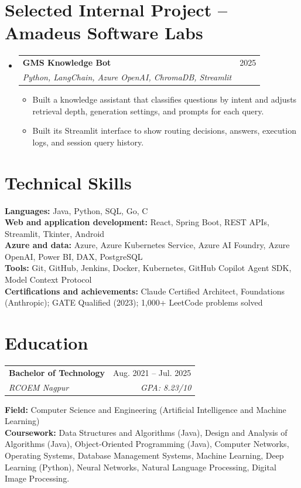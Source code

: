 \documentclass[a4paper,11pt]{article}
\makeatletter
\newcommand{\entry}[4]{\item\begin{tabularx}{\textwidth}{@{}Xr@{}}\textbf{#1}& #2\\\textit{\small #3}&\textit{\small #4}\end{tabularx}\vspace{-5pt}}
\newcommand{\bulletpoint}[1]{\item\small{#1}}
\makeatother
\begin{document}
\section{Selected Internal Project -- Amadeus Software Labs}
\begin{itemize}[leftmargin=0in,label={}]
  \entry{GMS Knowledge Bot}{2025}{Python, LangChain, Azure OpenAI, ChromaDB, Streamlit}{}
  \begin{itemize}
    \bulletpoint{Built a knowledge assistant that classif{}ies questions by intent and adjusts retrieval depth, generation settings, and prompts for each query.}
    \bulletpoint{Built its Streamlit interface to show routing decisions, answers, execution logs, and session query history.}
  \end{itemize}
\end{itemize}

\section{Technical Skills}
\small\textbf{Languages:} Java, Python, SQL, Go, C \\
\textbf{Web and application development:} React, Spring Boot, REST APIs, Streamlit, Tkinter, Android \\
\textbf{Azure and data:} Azure, Azure Kubernetes Service, Azure AI Foundry, Azure OpenAI, Power BI, DAX, PostgreSQL \\
\textbf{Tools:} Git, GitHub, Jenkins, Docker, Kubernetes, GitHub Copilot Agent SDK, Model Context Protocol \\
\textbf{Certif{}ications and achievements:} Claude Certif{}ied Architect, Foundations (Anthropic); GATE Qualif{}ied (2023); 1,000+ LeetCode problems solved

\section{Education}
\begin{tabularx}{\textwidth}{@{}Xr@{}}
  \textbf{Bachelor of Technology} & Aug. 2021 -- Jul. 2025 \\
  \textit{\small RCOEM Nagpur} & \textit{\small GPA: 8.23/10} \\
\end{tabularx}
\small\textbf{Field:} Computer Science and Engineering (Artif{}icial Intelligence and Machine Learning)\\
\small\textbf{Coursework:} Data Structures and Algorithms (Java), Design and Analysis of Algorithms (Java), Object-Oriented Programming (Java), Computer Networks, Operating Systems, Database Management Systems, Machine Learning, Deep Learning (Python), Neural Networks, Natural Language Processing, Digital Image Processing.
\end{document}
